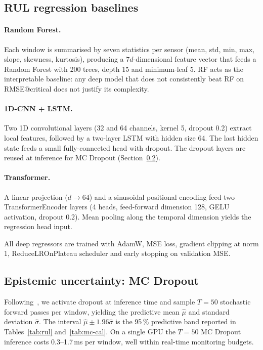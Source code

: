 \documentclass[5p,times,authoryear]{elsarticle}
\begin{document}
\subsection{RUL regression baselines}\label{sec:method-rul}

\paragraph{Random Forest.} Each window is summarised by seven statistics per sensor (mean, std, min, max, slope, skewness, kurtosis), producing a $7d$-dimensional feature vector that feeds a Random Forest with 200 trees, depth 15 and minimum-leaf 5. RF acts as the interpretable baseline: any deep model that does not consistently beat RF on RMSE@critical does not justify its complexity.

\paragraph{1D-CNN + LSTM.} Two 1D convolutional layers (32 and 64 channels, kernel 5, dropout 0.2) extract local features, followed by a two-layer LSTM with hidden size 64. The last hidden state feeds a small fully-connected head with dropout. The dropout layers are reused at inference for MC Dropout (Section~\ref{sec:method-mc}).

\paragraph{Transformer.} A linear projection ($d\to 64$) and a sinusoidal positional encoding feed two TransformerEncoder layers (4 heads, feed-forward dimension 128, GELU activation, dropout 0.2). Mean pooling along the temporal dimension yields the regression head input.

All deep regressors are trained with AdamW, MSE loss, gradient clipping at norm 1, ReduceLROnPlateau scheduler and early stopping on validation MSE.

\subsection{Epistemic uncertainty: MC Dropout}\label{sec:method-mc}

Following~\citet{gal2016dropout}, we activate dropout at inference time and sample $T=50$ stochastic forward passes per window, yielding the predictive mean $\hat\mu$ and standard deviation $\hat\sigma$. The interval $\hat\mu \pm 1.96\hat\sigma$ is the 95\,\% predictive band reported in Tables~\ref{tab:rul} and~\ref{tab:mc-cal}. On a single GPU the $T{=}50$ MC Dropout inference costs 0.3--1.7\,ms per window, well within real-time monitoring budgets.
\end{document}
